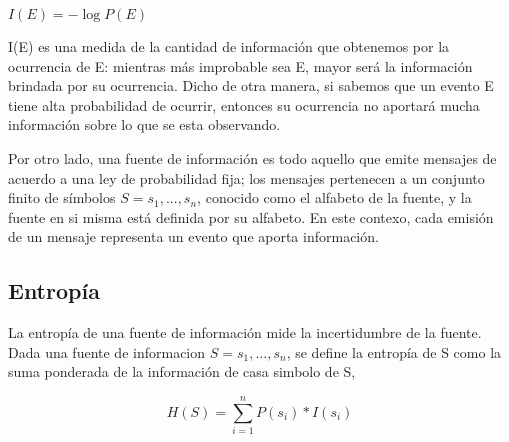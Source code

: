 \begin{center}
$I(E)=-\log{P(E)}$ 
\end{center}

I(E) es una medida de la cantidad de información que obtenemos por la ocurrencia de E: mientras más improbable sea E, mayor será la información brindada por su ocurrencia. Dicho de otra manera, si sabemos que un evento E tiene alta probabilidad de ocurrir, entonces su ocurrencia no aportará mucha información sobre lo que se esta observando.

Por otro lado, una fuente de información es todo aquello que emite mensajes de acuerdo a una ley de probabilidad fija; los mensajes pertenecen a un conjunto finito de símbolos $S={s_{1},...,s_{n}}$, conocido como el alfabeto de la fuente, y la fuente en si misma está definida por su alfabeto. En este contexo, cada emisión de un mensaje representa un evento que aporta información.


\subsection{Entropía}

La entropía de una fuente de información mide la incertidumbre de la fuente.
Dada una fuente de informacion $S={s_{1},...,s_{n}}$, se define la entropía de S como la suma ponderada de la información de casa simbolo de S,

$$H(S)=\sum^{n}_{i=1}{P(s_{i})*I(s_{i})}$$





